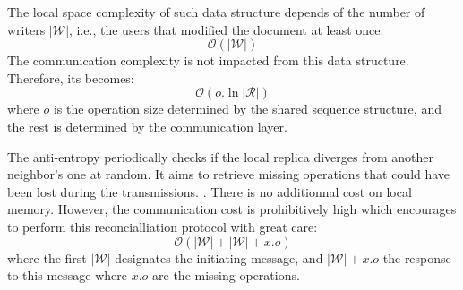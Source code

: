 \begin{asparadesc}
  The local space complexity of such data structure depends of the number of
  writers $|\mathcal{W}|$, i.e., the users that modified the document at least
  once:
  \begin{equation}
    \mathcal{O}(|\mathcal{W}|)
  \end{equation}
  The communication complexity is not impacted from this data structure. Therefore, 
  its becomes:
  \begin{equation}
    \mathcal{O}(o.\ln |\mathcal{R}|)
  \end{equation}
  where $o$ is the operation size determined by the shared sequence structure,
  and the rest is determined by the communication layer.

  The anti-entropy periodically checks if the local replica diverges from
  another neighbor's one at random. It aims to retrieve missing operations that
  could have been lost during the transmissions. . There is no
  additionnal cost on local memory. However, the communication cost is
  prohibitively high which encourages to perform this reconcialliation protocol
  with great care:
  \begin{equation}
    \mathcal{O}(|\mathcal{W}|+|\mathcal{W}|+x.o)
  \end{equation}
  where the first $|\mathcal{W}|$ designates the initiating message, and
  $|\mathcal{W}|+x.o$ the response to this message where $x.o$ are the missing
  operations.

\end{asparadesc}

